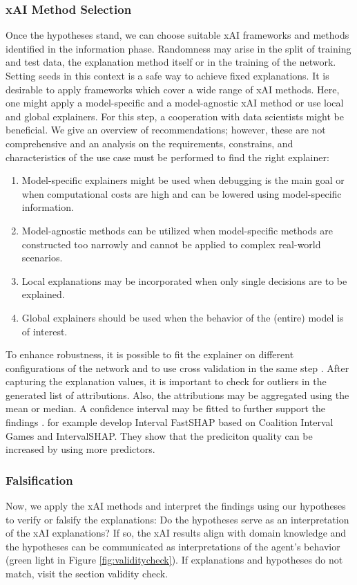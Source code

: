 \subsubsection{\textbf{xAI Method Selection}}
Once the hypotheses stand, we can choose suitable xAI frameworks and methods identified in the information phase. Randomness may arise in the split of training and test data, the explanation method itself or in the training of the network. Setting seeds in this context is a safe way to achieve fixed explanations.
It is desirable to apply frameworks which cover a wide range of xAI methods. Here, one might apply a model-specific and a model-agnostic xAI method or use local and global explainers. For this step, a cooperation with data scientists might be beneficial. We give an overview of recommendations; however, these are not comprehensive and an analysis on the requirements, constrains, and characteristics of the use case must be performed to find the right explainer:
\begin{enumerate}
    \item Model-specific explainers might be used when debugging is the main goal or when computational costs are high and can be lowered using model-speciﬁc information.
    \item Model-agnostic methods can be utilized when model-specific methods are constructed too narrowly and cannot be applied to complex real-world scenarios.
    \item Local explanations may be incorporated when only single decisions are to be explained.
    \item Global explainers should be used when the behavior of the (entire) model is of interest.

\end{enumerate}
To enhance robustness, it is possible to fit the explainer on different configurations of the network and to use cross validation in the same step \cite{brownecrossval}. After capturing the explanation values, it is important to check for outliers in the generated list of attributions. Also, the attributions may be aggregated using the mean or median. A confidence interval may be fitted to further support the findings .  for example develop Interval FastSHAP based on Coalition Interval Games and IntervalSHAP. They show that the prediciton quality can be increased by using more predictors.

\subsubsection{\textbf{Falsification}}
Now, we apply the xAI methods and interpret the findings using our hypotheses to verify or falsify the explanations: Do the hypotheses serve as an interpretation of the xAI explanations? If so, the xAI results align with domain knowledge and the hypotheses can be communicated as interpretations of the agent's behavior (green light in Figure \ref{fig:validitycheck}). If explanations and hypotheses do not match, visit the section validity check.

